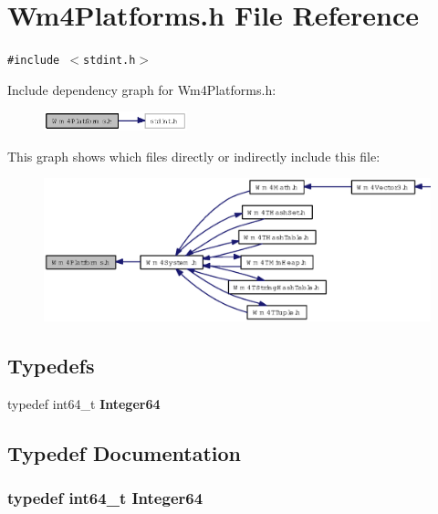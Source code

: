 \section{Wm4Platforms.h File Reference}
\label{Wm4Platforms_8h}
{\tt \#include $<$stdint.h$>$}\par


Include dependency graph for Wm4Platforms.h:\begin{figure}[H]
\begin{center}
\leavevmode
\includegraphics[width=118pt]{Wm4Platforms_8h__incl}
\end{center}
\end{figure}


This graph shows which files directly or indirectly include this file:\begin{figure}[H]
\begin{center}
\leavevmode
\includegraphics[width=352pt]{Wm4Platforms_8h__dep__incl}
\end{center}
\end{figure}
\subsection*{Typedefs}
\begin{CompactItemize}
\item 
typedef int64\_\-t {\bf Integer64}
\end{CompactItemize}


\subsection{Typedef Documentation}
\subsubsection{\setlength{\rightskip}{0pt plus 5cm}typedef int64\_\-t {\bf Integer64}}\label{Wm4Platforms_8h_69c8e96618c4b27fc9ee7dc3ec9f8346}


